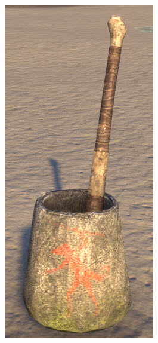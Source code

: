 \documentclass[12pt]{book}
\begin{document}
\begin{figure}
	\includegraphics[width=\textwidth]{mortarpestle.png}
\end{figure}
\end{document}
